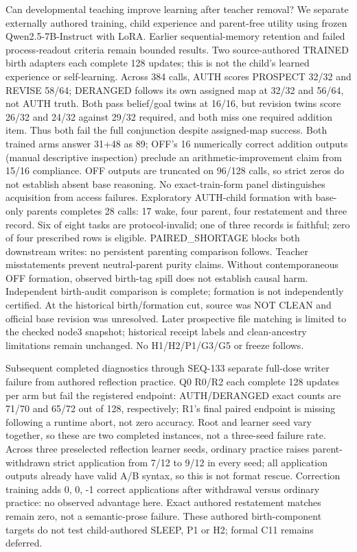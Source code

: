 \documentclass[11pt]{article}
\begin{document}
Can developmental teaching improve learning after teacher removal? We separate
externally authored training, child experience and parent-free utility using frozen
Qwen2.5-7B-Instruct with LoRA. Earlier sequential-memory retention and failed
process-readout criteria remain bounded results. Two source-authored TRAINED birth
adapters each complete 128 updates; this is not the child's learned experience or
self-learning. Across 384 calls, AUTH scores PROSPECT 32/32 and REVISE 58/64;
DERANGED follows its own assigned map at 32/32 and 56/64, not AUTH truth. Both pass
belief/goal twins at 16/16, but revision twins score 26/32 and 24/32 against 29/32
required, and both miss one required addition item. Thus both fail the full
conjunction despite assigned-map success. Both trained arms answer 31+48 as 89;
OFF's 16 numerically correct addition outputs (manual descriptive inspection)
preclude an arithmetic-improvement claim from 15/16 compliance.
OFF outputs are truncated on 96/128 calls,
so strict zeros do not establish absent base reasoning. No exact-train-form panel
distinguishes acquisition from access failures. Exploratory AUTH-child formation
with base-only parents completes 28 calls: 17 wake, four parent, four restatement
and three record. Six of eight tasks are protocol-invalid; one of three records is
faithful; zero of four prescribed rows is eligible. PAIRED\_SHORTAGE blocks both
downstream writes: no persistent parenting comparison follows. Teacher misstatements
prevent neutral-parent purity claims. Without contemporaneous OFF formation,
observed birth-tag spill does not establish causal harm. Independent birth-audit
comparison is complete; formation is not independently certified. At the historical birth/formation cut, source was NOT CLEAN and official base
revision was unresolved. Later prospective file matching is limited to the
checked node3 snapshot; historical receipt labels and clean-ancestry limitations
remain unchanged. No H1/H2/P1/G3/G5 or freeze follows.

Subsequent completed diagnostics through SEQ-133 separate full-dose writer
failure from authored reflection practice. Q0 R0/R2 each complete 128 updates
per arm but fail the registered endpoint: AUTH/DERANGED exact counts are
71/70 and 65/72 out of 128, respectively; R1's final paired endpoint is missing
following a runtime abort, not zero accuracy. Root and learner seed vary
together, so these are two completed instances, not a three-seed failure rate.
Across three preselected reflection learner seeds, ordinary practice raises
parent-withdrawn strict application from 7/12 to 9/12 in every seed; all application
outputs already have valid A/B syntax, so this is not format rescue. Correction
training adds 0, 0, -1 correct applications after withdrawal versus ordinary
practice: no observed advantage here. Exact authored restatement matches remain
zero, not a semantic-prose failure. These authored birth-component targets do
not test child-authored SLEEP, P1 or H2; formal C11 remains deferred.
\end{document}
